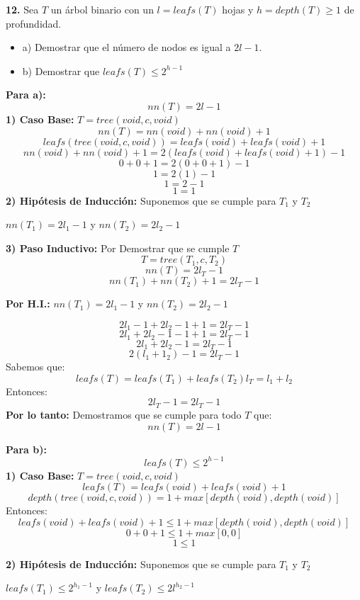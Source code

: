 \textbf{12.} Sea $T$ un árbol binario con un $l = leafs(T)$ hojas y $h = depth(T) \geq 1$ de profundidad.
\begin{itemize}
    \item a) Demostrar que el número de nodos es igual a $2l -1$.
    \item b) Demostrar que $leafs(T) \leq 2^{h -1}$
\end{itemize}
\textbf{Para a):}
\[
nn(T) = 2l - 1
\]
\textbf{1) Caso Base:} $T = tree(void, c , void)$
\[
nn(T) = nn(void) + nn(void) +1
\]
\[
leafs (tree(void, c , void)) = leafs(void) + leafs(void) + 1
\]
\[
nn(void) + nn(void) +1 = 2(leafs(void) + leafs(void) + 1) - 1
\]
\[
0 + 0 +1 = 2(0 + 0 + 1) - 1
\]
\[
1 = 2(1) - 1
\]
\[
1 = 2 - 1
\]
\[
1 = 1
\]
\textbf{2) Hipótesis de Inducción:} Suponemos que se cumple para $T_{1}$ y $T_{2}$
\begin{center}
    $nn(T_{1}) = 2l_{1} -1$   y     $nn(T_{2}) = 2l_{2} -1$ 
\end{center}

\textbf{3) Paso Inductivo:} Por Demostrar que se cumple  $T$
\[
T = tree(T_{1}, c , T_{2})
\]
\[
nn(T) = 2l_{T} -1
\]
\[
nn(T_{1}) + nn(T_{2}) + 1 = 2l_{T} -1
\]
\begin{center}
    \textbf{Por H.I.:} $nn(T_{1}) = 2l_{1} -1$   y     $nn(T_{2}) = 2l_{2} -1$ 
\end{center}
\[
2l_{1} -1 + 2l_{2} -1 + 1 = 2l_{T} -1
\]
\[
2l_{1} + 2l_{2} -1 -1 + 1 = 2l_{T} -1
\]
\[
2l_{1} + 2l_{2} -1  = 2l_{T} -1
\]
\[
2(l_{1} + 1_{2}) -1  = 2l_{T} -1
\]
Sabemos que: \\
\[
leafs(T) = leafs(T_{1}) + leafs(T_{2})
l_{T} = l_{1} + l_{2}
\]
Entonces: \\
\[
2l_{T} -1 = 2l_{T} -1
\]
\textbf{Por lo tanto:} Demostramos que se cumple para todo $T$ que:
\[
nn(T) = 2l - 1
\]

\newpage 
\textbf{Para b):}
\[
leafs(T) \leq 2^{h -1}
\]
\textbf{1) Caso Base:} $T = tree(void, c , void)$
\[
leafs(T) = leafs(void) + leafs(void) + 1 
\]
\[
depth(tree( void, c, void)) = 1 + max [depth(void), depth(void)]
\]
Entonces:
\[
leafs(void) + leafs(void) + 1 \leq 1 + max [depth(void), depth(void)]
\]
\[
0 + 0 + 1 \leq 1 + max [0, 0]
\]
\[
 1 \leq 1 
\]

\textbf{2) Hipótesis de Inducción:} Suponemos que se cumple para $T_{1}$ y $T_{2}$
\begin{center}
    $leafs(T_{1}) \leq 2^{h_{1}-1}$    y     $leafs(T_{2}) \leq 2l^{h_{2}-1}$ 
\end{center}

